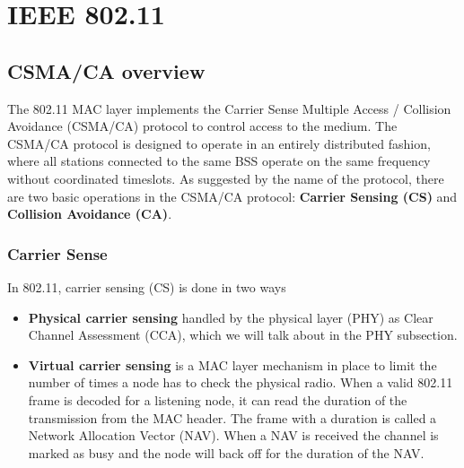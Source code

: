 \documentclass[a4paper,UKenglish]{report}
\begin{document}
\section{IEEE 802.11}

\subsection{CSMA/CA overview}
The 802.11 MAC layer implements the Carrier Sense Multiple Access / Collision Avoidance (CSMA/CA) protocol to control access to the medium.
The CSMA/CA protocol is designed to operate in an entirely distributed fashion, where all stations connected to the same BSS  operate on
the same frequency without coordinated timeslots. As suggested by the name of the protocol, there are two basic operations in the CSMA/CA protocol:
\textbf{Carrier Sensing (CS)} and \textbf{Collision Avoidance (CA)}. 

\subsubsection{Carrier Sense}
In 802.11, carrier sensing (CS) is done in two ways
\begin{itemize}
	\item \textbf{Physical carrier sensing} handled by the physical layer (PHY) as Clear Channel Assessment (CCA), which we will talk about in the PHY subsection.
	\item \textbf{Virtual carrier sensing} is a MAC layer mechanism in place to limit the number of times
		a node has to check the physical radio. When a valid 802.11 frame is decoded for a listening node, it can read the duration of
		the transmission from the MAC header. The frame with a duration is called a Network Allocation Vector (NAV). When a NAV is received 
		the channel is marked as busy and the node will back off for the duration of the NAV. 
\end{itemize} 
\end{document}
